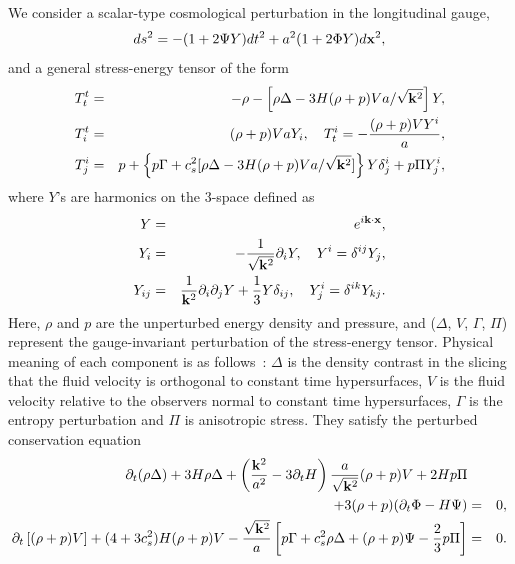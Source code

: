 We consider a scalar-type cosmological perturbation in the longitudinal
gauge,
%
\begin{equation}
 ds^2 = -(1+2\Psi Y)dt^2
  + a^2(1+2\Phi Y)d{\bf x}^2,
\end{equation}
and a general stress-energy tensor of the form 
%
\begin{eqnarray}
 T^t_t & = & - \rho
  - \left[\rho\Delta-3H(\rho+p)Va/\sqrt{{\bf k}^2}\right]Y, \nonumber\\
 T^t_i & = & (\rho+p)Va Y_i, \quad
 T^i_t = -\frac{(\rho+p)V Y^i}{a}, \nonumber\\
 T^i_j & = & p
  + \left\{ p\Gamma+ c_s^2[\rho\Delta
     -3H(\rho+p)Va/\sqrt{{\bf k}^2}]\right\}Y\delta^i_j
  + p\Pi Y^i_j,
\end{eqnarray}
where $Y$'s are harmonics on the $3$-space defined as
%
\begin{eqnarray}
 Y & = & e^{i{\bf k}\cdot{\bf x}}, \nonumber\\
 Y_i & = & -\frac{1}{\sqrt{{\bf k}^2}}\partial_i Y, \quad
 Y^i = \delta^{ij}Y_j, \nonumber\\
 Y_{ij} & = & \frac{1}{{\bf k}^2}\partial_i\partial_jY
  +\frac{1}{3}Y\delta_{ij}, \quad
 Y^i_j = \delta^{ik}Y_{kj}.
\end{eqnarray}
Here, $\rho$ and $p$ are the unperturbed energy density and pressure,
and ($\Delta$, $V$, $\Gamma$, $\Pi$) represent the gauge-invariant
perturbation of the stress-energy tensor. Physical meaning of each
component is as follows~\cite{Kodama:1985bj}: $\Delta$ is the density 
contrast in the slicing that the fluid velocity is orthogonal to
constant time hypersurfaces, $V$ is the fluid velocity relative to the
observers normal to constant time hypersurfaces, $\Gamma$ is the entropy
perturbation and $\Pi$ is anisotropic stress. They satisfy the perturbed
conservation equation  
%
\begin{eqnarray}
 \partial_t(\rho\Delta)+3H\rho\Delta
  + \left(\frac{{\bf k}^2}{a^2}-3\partial_t H\right)
  \frac{a}{\sqrt{{\bf k}^2}}(\rho+p)V + 2Hp\Pi & & \nonumber\\
  + 3(\rho+p)(\partial_t\Phi-H\Psi) & = & 0, \nonumber\\
 \partial_t\left[(\rho+p)V\right]+(4+3c_s^2)H(\rho+p)V
  -\frac{\sqrt{{\bf k}^2}}{a}
  \left[ p\Gamma + c_s^2\rho\Delta+(\rho+p)\Psi-\frac{2}{3}p\Pi
  \right] & = & 0.\nonumber\\
\end{eqnarray}
